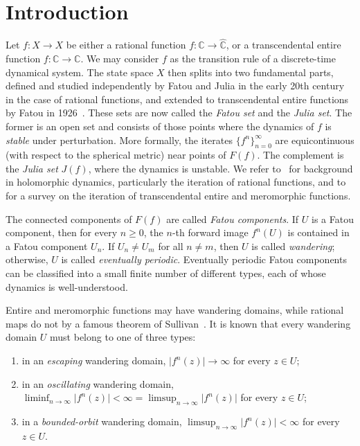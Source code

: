 \documentclass[12pt,a4paper,reqno]{amsart}
\theoremstyle{plain}
\theoremstyle{definition}
\theoremstyle{remark}
\numberwithin{equation}{section}
\newcommand \C{\mathbb{C}}
\newcommand \Ch{\widehat{\mathbb{C}}}
\newcommand{\lr}[1]{{\color{magenta} #1}}
\begin{document}
\maketitle

\section{Introduction}
Let $f\colon X\to X$ 
be either a rational function
 $f\colon\Ch\to\Ch$, or a 
 transcendental entire function
 $f\colon \C\to\C$. We may consider 
 $f$ as the transition rule of a
 discrete-time dynamical system. The
 state space $X$ then splits into two
 fundamental parts, 
 defined and studied independently
 by Fatou and Julia in the
 early 20th century in the case
 of rational functions, and extended 
 to transcendental entire functions
 by Fatou in 1926~\cite{fatou26}. These
 sets are now called the \emph{Fatou set} 
 and the \emph{Julia set}. The former
 is an open set and 
 consists of those points where the 
 dynamics of $f$ is \emph{stable} under
 perturbation. More formally, 
 the iterates $\{f^n\}_{n=0}^{\infty}$ 
 are equicontinuous (with respect to the
 spherical metric) near points of $F(f)$.
 The complement is the 
 \emph{Julia set} $J(f)$, where the dynamics is
 unstable.
 We refer to~\cite{milnor06} for background
  in holomorphic dynamics, particularly
  the iteration of rational functions,
  and to~\cite{bergweiler93} for a 
  survey on the iteration of
  transcendental entire and meromorphic functions.

 The connected components of $F(f)$ are 
 called \emph{Fatou components}.
 If $U$ is  a Fatou component, then
 for every $n\geq 0$, the $n$-th 
 forward image
 $f^n(U)$ is contained in a Fatou component
 $U_n$. If $U_n\neq U_m$ for all $n\neq m$, 
 then $U$ is called \emph{wandering};
 otherwise, $U$ is called \emph{eventually periodic}. 
 Eventually periodic Fatou components
 can be classified into  a small 
 finite number of different types, each of whose dynamics
 is well-understood. 

Entire \lr{and meromorphic} functions may have wandering domains,
  while rational maps do not by a famous theorem of Sullivan~\cite{sullivan85}. 
It is known that every 
 wandering domain $U$ must belong to one
 of three types:
 \begin{enumerate}
    \item in an \emph{escaping} 
      wandering domain, $\lvert f^n(z)\rvert \to \infty$ for every $z\in U$;
     \item in an \emph{oscillating}
      wandering domain, 
        $\liminf_{n\to\infty} \lvert f^n(z)\rvert < \infty =\limsup_{n\to\infty} \lvert f^n(z)\rvert$
        for every $z\in U$;
     \item in a \emph{bounded-orbit}
     wandering domain, 
     $\limsup_{n\to\infty} \lvert f^n(z)\rvert < \infty$ for every $z\in U$.
 \end{enumerate}
\end{document}
